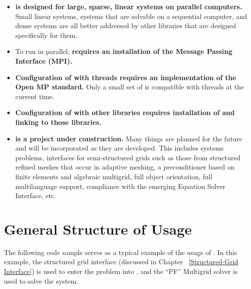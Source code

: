 \begin{itemize}

\item
{\bf \hypre{} is designed for large, sparse, linear systems on parallel
computers.}  Small linear systems, 
systems that are solvable on a sequential computer, and dense systems are all
better addressed by other libraries that are designed specifically for them. 

\item
To run in parallel, {\bf \hypre{} requires an installation of the Message Passing Interface (MPI).}

\item
{\bf Configuration of \hypre{} with threads
requires an implementation of the Open MP standard.}
Only a small set of \hypre{} is compatible with threads at the current time.

\item
{\bf Configuration of \hypre{} with other libraries requires installation of and
linking to those libraries.}

\item
{\bf \hypre{} is a project under construction.} Many things are planned
for the future and will be incorporated as they are developed.
This includes systems problems, interfaces for semi-structured grids
such as those from structured refined meshes that occur in adaptive meshing,
a preconditioner based on finite elements and algebraic multigrid,
full object orientation, full multilanguage support, compliance
with the emerging Equation Solver Interface, etc.

\end{itemize}




\chapter{General Structure of Usage}

The following code sample serves as a typical example of the usage
of \hypre{}. In this example, the structured grid interface (discussed
in Chapter
~\ref{Structured-Grid Interface}) is used to enter the problem
into \hypre{}, and the ``PF'' Multigrid solver is used to solve
the system.

